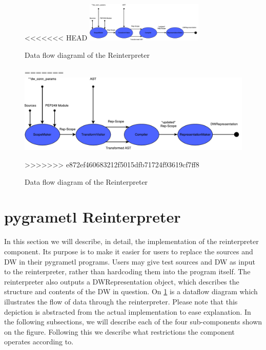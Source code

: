 \begin{figure}
\centering
<<<<<<< HEAD
\includegraphics[width=0.5\textwidth]{figures/reinterpreter.pdf}
\caption{Data flow diagraml of the Reinterpreter}
=======
\includegraphics[width=1\textwidth]{figures/reinterpreter.pdf}
\caption{Data flow diagram of the Reinterpreter}
>>>>>>> e872ef460683212f5015dfb71724f93619cf7ff8
\label{fig:reinterpreter}
\end{figure}

\section{pygrametl Reinterpreter}

In this section we will describe, in detail, the implementation of the reinterpreter component. Its purpose is to make it easier for users to replace the sources and DW in their pygrametl programs. Users may give test sources and DW as input to the reinterpreter, rather than hardcoding them into the program itself. The reinterpreter also outputs a DWRepresentation object, which describes the structure and contents of the DW in question. On \cref{fig:reinterpreter} is a dataflow diagram which illustrates the flow of data through the reinterpreter. Please note that this depiction is abstracted from the actual implementation to ease explanation. In the following subsections, we will describe each of the four sub-components shown on the figure. Following this we describe what restrictions the component operates according to.


